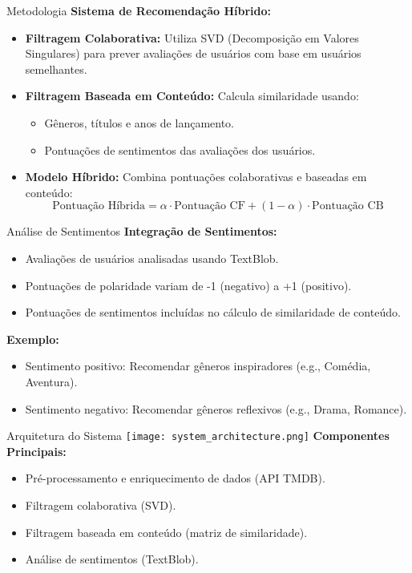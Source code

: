 \documentclass{beamer}
\begin{document}
\begin{frame}{Metodologia}
    \textbf{Sistema de Recomendação Híbrido:}
    \begin{itemize}
        \item \textbf{Filtragem Colaborativa:} Utiliza SVD (Decomposição em Valores Singulares) para prever avaliações de usuários com base em usuários semelhantes.
        \item \textbf{Filtragem Baseada em Conteúdo:} Calcula similaridade usando:
        \begin{itemize}
            \item Gêneros, títulos e anos de lançamento.
            \item Pontuações de sentimentos das avaliações dos usuários.
        \end{itemize}
        \item \textbf{Modelo Híbrido:} Combina pontuações colaborativas e baseadas em conteúdo:
        \[
        \text{Pontuação Híbrida} = \alpha \cdot \text{Pontuação CF} + (1 - \alpha) \cdot \text{Pontuação CB}
        \]
    \end{itemize}
\end{frame}

\begin{frame}{Análise de Sentimentos}
    \textbf{Integração de Sentimentos:}
    \begin{itemize}
        \item Avaliações de usuários analisadas usando TextBlob.
        \item Pontuações de polaridade variam de -1 (negativo) a +1 (positivo).
        \item Pontuações de sentimentos incluídas no cálculo de similaridade de conteúdo.
    \end{itemize}
    \vspace{0.5cm}
    \textbf{Exemplo:}
    \begin{itemize}
        \item Sentimento positivo: Recomendar gêneros inspiradores (e.g., Comédia, Aventura).
        \item Sentimento negativo: Recomendar gêneros reflexivos (e.g., Drama, Romance).
    \end{itemize}
\end{frame}

\begin{frame}{Arquitetura do Sistema}
    \texttt{[image: system\_architecture.png]}
    \vspace{0.5cm}
    \textbf{Componentes Principais:}
    \begin{itemize}
        \item Pré-processamento e enriquecimento de dados (API TMDB).
        \item Filtragem colaborativa (SVD).
        \item Filtragem baseada em conteúdo (matriz de similaridade).
        \item Análise de sentimentos (TextBlob).
    \end{itemize}
\end{frame}
\end{document}
